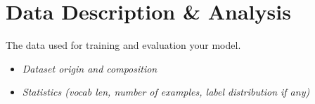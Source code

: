 \section{Data Description \& Analysis}
The data used for training and evaluation your model.
\begin{itemize}
    \item \textit{Dataset origin and composition}
    \item \textit{Statistics (vocab len, number of examples, label distribution if any)}
\end{itemize}